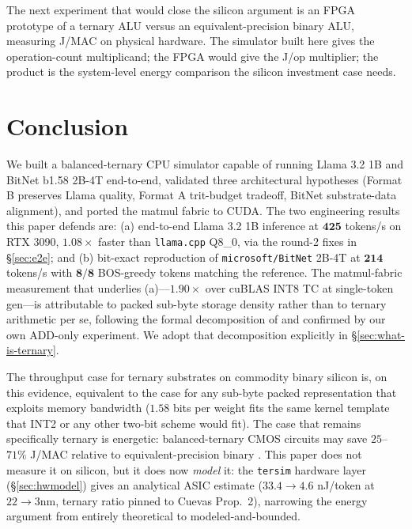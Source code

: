 \documentclass{article}
\begin{document}
The next experiment that would close the silicon argument is an {FPGA}
prototype of a ternary {ALU} versus an equivalent-precision binary {ALU},
measuring J/MAC on physical hardware. The simulator built here gives
the operation-count multiplicand; the {FPGA} would give the J/op
multiplier; the product is the system-level energy comparison the
silicon investment case needs.

\section{Conclusion}

We built a balanced-ternary {CPU} simulator capable of running
Llama 3.2 1B and BitNet b1.58 2B-4T end-to-end, validated three
architectural hypotheses (Format B preserves Llama quality, Format A
trit-budget tradeoff, BitNet substrate-data alignment), and ported the
matmul fabric to {CUDA}. The two engineering results this paper
defends are: (a) end-to-end Llama 3.2 1B inference at $\mathbf{425}$
tokens/s on {RTX 3090}, $\mathbf{1.08\times}$ faster than
\texttt{llama.cpp} {Q8\_0}, via the round-2 fixes in \S\ref{sec:e2e};
and (b) bit-exact reproduction of \texttt{microsoft/BitNet} 2B-4T at
$\mathbf{214}$ tokens/s with $\mathbf{8/8}$ {BOS}-greedy tokens
matching the reference. The matmul-fabric measurement that underlies
(a)---$1.90\times$ over cuBLAS {INT8} {TC} at single-token gen---is
attributable to packed sub-byte storage density rather than to
ternary arithmetic per se, following the formal decomposition of
\citet{cuevas-formal-2026} and confirmed by our own {ADD}-only
experiment. We adopt that decomposition explicitly in
\S\ref{sec:what-is-ternary}.

The throughput case for ternary substrates on commodity binary silicon
is, on this evidence, equivalent to the case for any sub-byte packed
representation that exploits memory bandwidth ($1.58$ bits per weight
fits the same kernel template that {INT2} or any other two-bit scheme
would fit). The case that remains specifically ternary is energetic:
balanced-ternary {CMOS} circuits may save $25$--$71\%$ J/{MAC}
relative to equivalent-precision binary
\citep{horowitz-energy-2014,cutie-2020,cuevas-formal-2026}. This paper
does not measure it on silicon, but it does now \emph{model} it: the
\texttt{tersim} hardware layer (\S\ref{sec:hwmodel}) gives an analytical
{ASIC} estimate ($33.4 \to 4.6$ nJ/token at $22 \to 3$nm, ternary ratio
pinned to Cuevas Prop.~2), narrowing the energy argument from entirely
theoretical to modeled-and-bounded.
\end{document}
